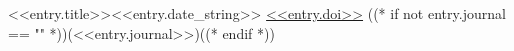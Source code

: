 \resumeSubheading
    {<<entry.title>>}{<<entry.date_string>>}
    {\href{<<entry.doi_url>>}{<<entry.doi>>} ((* if not entry.journal == "" *))(<<entry.journal>>)((* endif *))}{}
    \resumeItemListStart
    \resumeItemListEnd